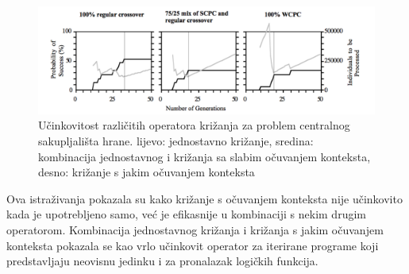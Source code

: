 \begin{figure}[H]
	\centering
	\includegraphics[scale=0.4]{./slike/ants.png}
	\caption{Učinkovitost različitih operatora križanja za problem centralnog sakupljališta hrane. lijevo: jednostavno križanje, sredina: kombinacija jednostavnog i križanja sa slabim očuvanjem konteksta, desno:  križanje s jakim očuvanjem konteksta}
	\label{ants}
\end{figure}



Ova istraživanja pokazala su kako križanje s očuvanjem konteksta nije učinkovito kada je upotrebljeno samo, već je efikasnije u kombinaciji s nekim drugim operatorom. Kombinacija jednostavnog križanja i križanja s jakim očuvanjem konteksta pokazala se kao vrlo učinkovit operator za iterirane programe koji predstavljaju neovisnu jedinku i za pronalazak logičkih funkcija.

